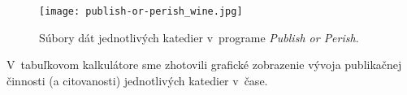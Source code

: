 \begin{figure}
  \centering
  \texttt{[image: publish-or-perish\_wine.jpg]}
  \caption{Súbory dát jednotlivých katedier v~programe \emph{Publish or
      Perish}.}
  \label{fig:pop.screenshot}
\end{figure}

V~tabuľkovom kalkulátore sme zhotovili grafické zobrazenie vývoja publikačnej
činnosti (a citovanosti) jednotlivých katedier v~čase.


